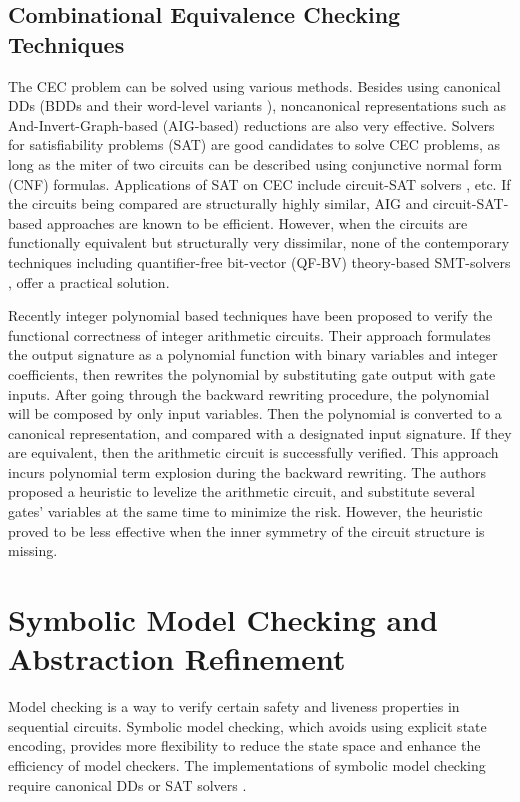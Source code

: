 \subsection{Combinational Equivalence Checking Techniques}
The CEC problem can be solved using various methods.
Besides using canonical DDs (BDDs
\cite{BRYA86} and their word-level variants \cite{WLS}),
noncanonical representations such as And-Invert-Graph-based (AIG-based) reductions 
\cite{AIG:2002,alanmi:cec:iccad2006} are also very effective. 
Solvers for satisfiability problems (SAT) are good candidates to solve CEC problems,
as long as the miter of two circuits can be described using conjunctive normal form (CNF)
formulas. Applications of SAT on CEC include circuit-SAT solvers \cite{csat}, etc.
If the circuits being compared are structurally highly similar, AIG and circuit-SAT-based
approaches are known to be efficient.
However, when the circuits are functionally equivalent but structurally very dissimilar, none of the 
  contemporary techniques including quantifier-free bit-vector 
  (QF-BV) theory-based SMT-solvers \cite{Cryptol:fmcad09},
  offer a practical solution.    


Recently integer polynomial based techniques \cite{ciesielski2014function,rolf:date16} have been proposed  to verify the functional 
correctness of integer arithmetic circuits. Their approach formulates the output signature as a polynomial function 
with binary variables and integer coefficients, then rewrites the polynomial by substituting gate output with gate 
inputs. After going through the backward rewriting procedure,  the polynomial
will be composed by only input variables. Then the polynomial is converted to a canonical representation, and compared
with a designated input signature. If they are equivalent, then the arithmetic circuit is successfully verified.
This approach incurs polynomial term explosion during the backward rewriting. The authors proposed a heuristic
to levelize the arithmetic circuit, and substitute several gates' variables at the same time to minimize the risk. However, 
the heuristic proved to be less effective when the inner symmetry of the circuit structure is missing.

  
\section{Symbolic Model Checking and Abstraction Refinement}
Model checking is a way to verify certain safety and liveness properties 
in sequential circuits. Symbolic model checking, which avoids using explicit state encoding,
provides more flexibility to reduce the state space and enhance the 
efficiency of model checkers. The implementations of symbolic model checking 
require canonical DDs or SAT solvers \cite{burch1990sequential,burch1991representing,biere1999symbolic}.


